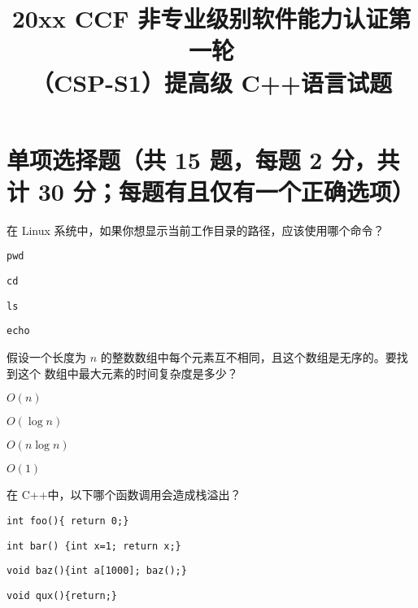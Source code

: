 \documentclass{exam-zh}
\title{20xx CCF 非专业级别软件能力认证第一轮\\（CSP-S1）提高级 C++语言试题}
\newcommand{\code}[1]{\texttt{#1}}
\begin{document}
\maketitle

\section{单项选择题（共 15 题，每题 2 分，共计 30 分；每题有且仅有一个正确选项）}

\begin{question}
    在 Linux 系统中，如果你想显示当前工作目录的路径，应该使用哪个命令？~\paren[A]
    \begin{choices}
        \item \code{pwd}
        \item \code{cd}
        \item \code{ls}
        \item \code{echo}
    \end{choices}   
\end{question}

\begin{solution}

\end{solution}

\begin{question}
    假设一个长度为 $n$ 的整数数组中每个元素互不相同，且这个数组是无序的。要找到这个
数组中最大元素的时间复杂度是多少？\paren[A]
\begin{choices}
    \item $O(n)$
    \item $O(\log n)$
    \item $O(n \log n)$
    \item $O(1)$
\end{choices}
\end{question}

\begin{solution}

\end{solution}


\begin{question}
    在 C++中，以下哪个函数调用会造成栈溢出？\paren[C]
\begin{choices}
    \item \code{int foo()\{ return 0;\}}
    \item \code{int bar() \{int x=1; return x;\}}
    \item \code{void baz()\{int a[1000]; baz();\}}
    \item \code{void qux()\{return;\}}
\end{choices}
\end{question}
\end{document}
